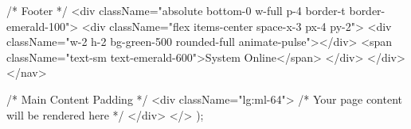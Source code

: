 {        {/* Footer */}
        <div className="absolute bottom-0 w-full p-4 border-t border-emerald-100">
          <div className="flex items-center space-x-3 px-4 py-2">
            <div className="w-2 h-2 bg-green-500 rounded-full animate-pulse"></div>
            <span className="text-sm text-emerald-600">System Online</span>
          </div>
        </div>
      </nav>

      {/* Main Content Padding */}
      <div className="lg:ml-64">
        {/* Your page content will be rendered here */}
      </div>
    </>
  );
}
